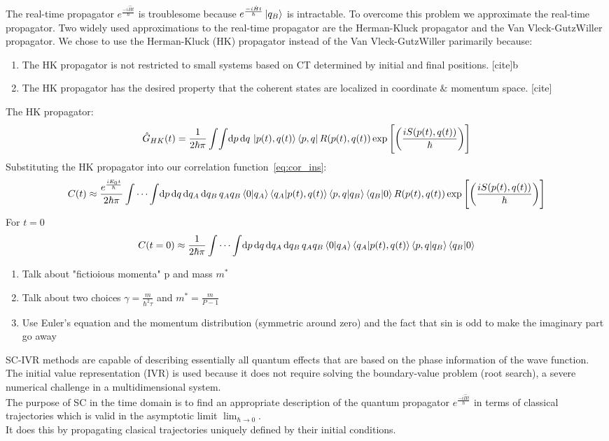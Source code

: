 \documentclass[12pt,letterpaper,oneside,final,titlepage]{article}               %
\numberwithin{equation}{section} %
\newcommand{\emiHt}{e^{\frac{-i\hat{H}t}{\hbar}}}
\newcommand{\expb}[1]{\ensuremath{\exp{\left[ #1 \right]}}}
\begin{document}
The real-time propagator $\emiHt$ is troublesome because $\emiHt\ket{q_{B}}$ is intractable. 
To overcome this problem we approximate the real-time propagator.
Two widely used approximations to the real-time propagator are the Herman-Kluck propagator and the Van Vleck-GutzWiller propagator.
We chose to use the Herman-Kluck (HK) propagator instead of the Van Vleck-GutzWiller parimarily because:
\begin{enumerate}
    \item The HK propagator is not restricted to small systems based on CT determined by initial and final positions. [cite]b
    \item The HK propagator has the desired property that the coherent states are localized in coordinate $\&$ momentum space. [cite]
\end{enumerate}
The HK propagator:
\begin{equation}\label{eq:HKprop}
    \hat{G}_{HK}(t) = \frac{1}{2\hbar\pi}\int\!\int \!\dif p\,\!\dif q\, 
    \ket{p(t), q(t)}\bra{p,q} R(p(t),q(t))
    \expb{\left(\frac{iS(p(t),q(t))}{\hbar}\right)}
\end{equation}
Substituting the HK propagator into our correlation function~\eqref{eq:cor_ins}:
\begin{equation*}
    C(t) \approx \frac{e^{\frac{iE_{0}t}{\hbar}}}{2\hbar\pi}\int\cdots\int\! \dif p\,\!\dif q\,\!\dif q_{A}\,\!\dif q_{B}\,
    q_{A}q_{B}\braket{0|q_{A}}\braket{q_{A}|p(t), q(t)} \braket{p,q|q_{B}}\braket{q_{B}|0}
    R(p(t),q(t)) \expb{\left(\frac{iS(p(t),q(t))}{\hbar}\right)}
\end{equation*}
For $t=0$
\begin{equation*}
    C(t=0) \approx \frac{1}{2\hbar\pi}\int\cdots\int\! \dif p\,\!\dif q\,\!\dif q_{A}\,\!\dif q_{B}\,
    q_{A}q_{B}\braket{0|q_{A}}\braket{q_{A}|p(t), q(t)} \braket{p,q|q_{B}}\braket{q_{B}|0}
\end{equation*}
\begin{enumerate}
    \item Talk about "fictioious momenta" p and mass $m^{*}$
    \item Talk about two choices $\gamma = \frac{m}{\hbar^{2}\tau}$ and $m^{*} = \frac{m}{P-1}$
    \item Use Euler's equation and the momentum distribution (symmetric around zero) and the fact that sin is odd to make the imaginary part go away
\end{enumerate}
SC-IVR methods are capable of describing essentially all quantum effects that are based on the phase information of the wave function.
The initial value representation (IVR) is used because it does not require solving the boundary-value problem (root search), a severe numerical challenge in a multidimensional system. \\
The purpose of SC in the time domain is to find an appropriate description of the quantum propagator $\emiHt$ 
in terms of classical trajectories which is valid in the asymptotic limit $\lim_{\hbar \to 0}$. \\
It does this by propagating clasical trajectories uniquely defined by their initial conditions.
\end{document}
